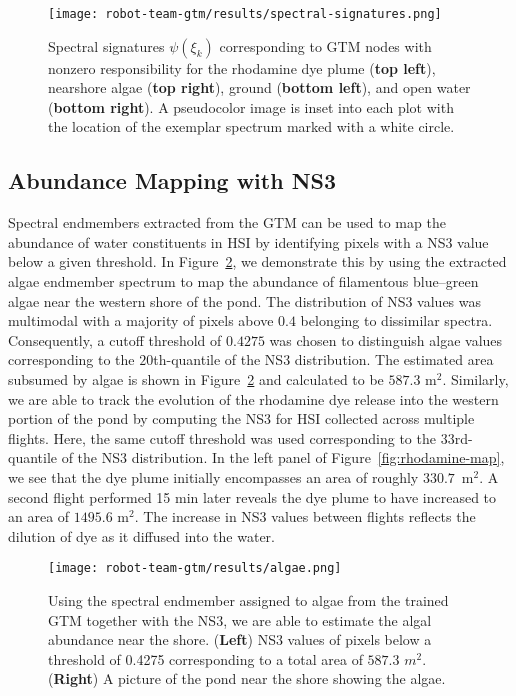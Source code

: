 \clearpage
\newpage

\begin{figure}[H]
  \centering
  \texttt{[image: robot-team-gtm/results/spectral-signatures.png]}
  \caption{Spectral signatures $\psi(\xi_k)$ corresponding to GTM nodes with
    nonzero responsibility for the rhodamine dye plume (\textbf{top left}),
    nearshore algae (\textbf{top right}), ground (\textbf{bottom left}), and
    open water (\textbf{bottom right}). A pseudocolor image is inset into each
    plot with the location of the exemplar spectrum marked with a white
    circle.}
  \label{fig:spectral-signatures}
\end{figure}

\clearpage
\newpage

\subsection{Abundance Mapping with NS3}


Spectral endmembers extracted from the GTM can be used to map the abundance of water constituents in HSI by identifying pixels with a NS3 value below a given threshold. In Figure~\ref{fig:algae-map}, we demonstrate this by using the extracted algae endmember spectrum to map the abundance of filamentous blue--green algae near the western shore of the pond. The distribution of NS3 values was multimodal with a majority of pixels above $0.4$ belonging to dissimilar spectra. Consequently, a cutoff threshold of $0.4275$ was chosen to distinguish algae values corresponding to the $20$th-quantile of the NS3 distribution. The estimated area subsumed by algae is shown in Figure~\ref{fig:algae-map} and calculated to be $587.3$ m$^2$. Similarly, we are able to track the evolution of the rhodamine dye release into the western portion of the pond by computing the NS3 for HSI collected across multiple flights. Here, the same cutoff threshold was used corresponding to the $33$rd-quantile of the NS3 distribution. In the left panel of Figure~\ref{fig:rhodamine-map}, we see that the dye plume initially encompasses an area of roughly $330.7$~m$^2$. A second flight performed 15 min later reveals the dye plume to have increased to an area of $1495.6$ m$^2$. The increase in NS3 values between flights reflects the dilution of dye as it diffused into the water.

\clearpage
\newpage

\begin{figure}[H]
  \centering
  \texttt{[image: robot-team-gtm/results/algae.png]}
  \caption{Using the spectral endmember assigned to algae from the trained GTM
    together with the NS3, we are able to estimate the algal abundance near the
    shore. (\textbf{Left}) NS3 values of pixels below a threshold of 0.4275
    corresponding to a total area of $587.3$ $m^2$. (\textbf{Right}) A picture
    of the pond near the shore showing the algae.}
  \label{fig:algae-map}
\end{figure}


